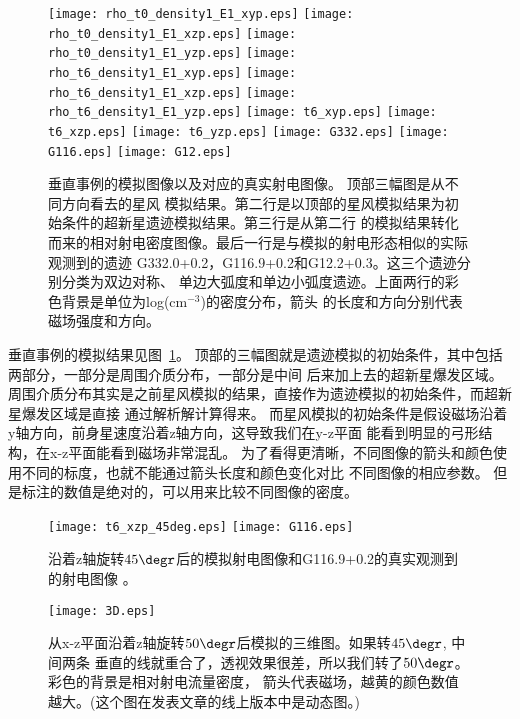 \begin{figure*}
    \centering
    \texttt{[image: rho\_t0\_density1\_E1\_xyp.eps]}
    \texttt{[image: rho\_t0\_density1\_E1\_xzp.eps]}
    \texttt{[image: rho\_t0\_density1\_E1\_yzp.eps]}\newline
    \texttt{[image: rho\_t6\_density1\_E1\_xyp.eps]}
    \texttt{[image: rho\_t6\_density1\_E1\_xzp.eps]}
    \texttt{[image: rho\_t6\_density1\_E1\_yzp.eps]}\newline
    \texttt{[image: t6\_xyp.eps]}
    \texttt{[image: t6\_xzp.eps]}
    \texttt{[image: t6\_yzp.eps]}\newline
    \texttt{[image: G332.eps]}
    \texttt{[image: G116.eps]}
    \texttt{[image: G12.eps]}
    \caption{垂直事例的模拟图像以及对应的真实射电图像。 顶部三幅图是从不同方向看去的星风
    模拟结果。第二行是以顶部的星风模拟结果为初始条件的超新星遗迹模拟结果。第三行是从第二行
    的模拟结果转化而来的相对射电密度图像。最后一行是与模拟的射电形态相似的实际观测到的遗迹
    G332.0+0.2，G116.9+0.2和G12.2+0.3\citep{West2016}。这三个遗迹分别分类为双边对称、
    单边大弧度和单边小弧度遗迹。上面两行的彩色背景是单位为log(cm$^{-3}$)的密度分布，箭头
    的长度和方向分别代表磁场强度和方向。}
\label{fig:per}
\end{figure*}

垂直事例的模拟结果见图~\ref{fig:per}。
顶部的三幅图就是遗迹模拟的初始条件，其中包括两部分，一部分是周围介质分布，一部分是中间
后来加上去的超新星爆发区域。
周围介质分布其实是之前星风模拟的结果，直接作为遗迹模拟的初始条件，而超新星爆发区域是直接
通过解析解计算得来。
而星风模拟的初始条件是假设磁场沿着y轴方向，前身星速度沿着z轴方向，这导致我们在y-z平面
能看到明显的弓形结构，在x-z平面能看到磁场非常混乱。
为了看得更清晰，不同图像的箭头和颜色使用不同的标度，也就不能通过箭头长度和颜色变化对比
不同图像的相应参数。
但是标注的数值是绝对的，可以用来比较不同图像的密度。

\begin{figure}
    \centering
    \texttt{[image: t6\_xzp\_45deg.eps]}
    \texttt{[image: G116.eps]}
    \caption{沿着z轴旋转$45\degr$后的模拟射电图像和G116.9+0.2的真实观测到的射电图像
    \citep{West2016,Tian2006}。}
\label{fig:45deg}
\end{figure}

\begin{figure*}
    \centering
    \texttt{[image: 3D.eps]}
    \caption{从x-z平面沿着z轴旋转$50\degr$后模拟的三维图。如果转$45\degr$, 中间两条
    垂直的线就重合了，透视效果很差，所以我们转了$50\degr$。彩色的背景是相对射电流量密度，
    箭头代表磁场，越黄的颜色数值越大。(这个图在发表文章的线上版本中是动态图。)}
\label{fig:3D}
\end{figure*}

